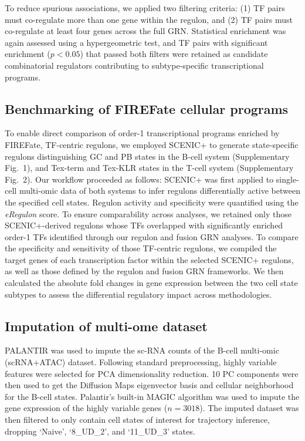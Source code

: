 \documentclass[11pt]{article}
\begin{document}
To reduce spurious associations, we applied two filtering criteria:
(1) TF pairs must co-regulate more than one gene within the regulon, and (2) TF pairs
must co-regulate at least four genes across the full GRN. Statistical enrichment was
again assessed using a hypergeometric test, and TF pairs with significant enrichment
($p < 0.05$) that passed both filters were retained as candidate combinatorial
regulators contributing to subtype-specific transcriptional programs.

\subsection*{Benchmarking of FIREFate cellular programs}

To enable direct comparison of order-1 transcriptional programs enriched by FIREFate,
TF-centric regulons, we employed SCENIC+ to generate state-specific regulons
distinguishing GC and PB states in the B-cell system (Supplementary Fig.~1), and Tex-term
and Tex-KLR states in the T-cell system (Supplementary Fig.~2). Our workflow proceeded as
follows: SCENIC+ was first applied to single-cell multi-omic data of both systems to
infer regulons differentially active between the specified cell states. Regulon activity
and specificity were quantified using the \textit{eRegulon} score. To ensure comparability
across analyses, we retained only those SCENIC+-derived regulons whose TFs overlapped with
significantly enriched order-1 TFs identified through our regulon and fusion GRN
analyses. To compare the specificity and sensitivity of those TF-centric regulons, we
compiled the target genes of each transcription factor within the selected SCENIC+
regulons, as well as those defined by the regulon and fusion GRN frameworks. We then
calculated the absolute fold changes in gene expression between the two cell state
subtypes to assess the differential regulatory impact across methodologies.

\subsection*{Imputation of multi-ome dataset}

PALANTIR was used to impute the sc-RNA counts of the B-cell multi-omic (scRNA+ATAC)
dataset. Following standard preprocessing, highly variable features were selected for
PCA dimensionality reduction. 10 PC components were then used to get the Diffusion Maps
eigenvector basis and cellular neighborhood for the B-cell states. Palantir's built-in
MAGIC algorithm was used to impute the gene expression of the highly variable genes
($n = 3018$). The imputed dataset was then filtered to only contain cell states of
interest for trajectory inference, dropping `Naive', `8\_UD\_2', and `11\_UD\_3' states.
\end{document}

